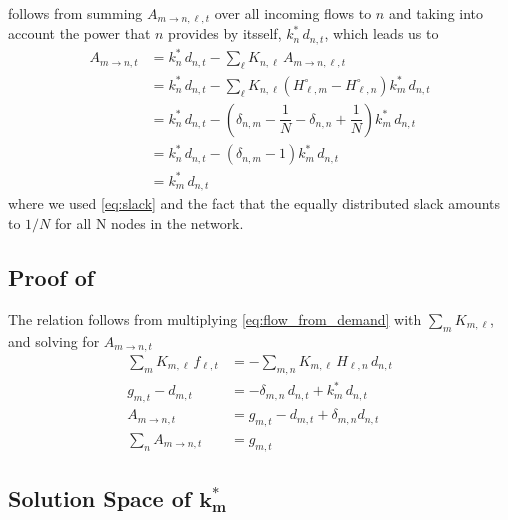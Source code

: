 \documentclass[11pt,twocolumn]{article}
\newcommand{\nodalgeneration}[1][n]{g_{#1,t}}
\newcommand{\nodaldemand}[1][n]{d_{#1,t}}
\newcommand{\incidence}[1][n]{K_{#1,\ell}}
\newcommand{\ptdf}[1][n]{H_{\ell,#1}}
\newcommand{\ptdfEqual}[1][n]{\ptdf[#1]^\circ}
\newcommand{\slackk}[1][n]{k^*_{#1}}
\newcommand{\flow}{f_{\ell,t}}
\newcommand{\allocatePeer}[1][m \rightarrow n]{A_{#1,t}}
\newcommand{\allocateTransaction}[1][m \rightarrow n]{A_{#1,\ell,t}}
\begin{document}
 follows from summing $\allocateTransaction$ over all incoming flows to $n$ and taking into account the power that $n$ provides by itsself, $\slackk \, \nodaldemand$, which leads us to
\begin{align}
 \allocatePeer &= \slackk \, \nodaldemand - \sum_{\ell} \incidence \, \allocateTransaction \\
 &= \slackk \, \nodaldemand - \sum_\ell \incidence \left(  \ptdfEqual[m] - \ptdfEqual \right) \slackk[m] \, \nodaldemand  \\
 &= \slackk \, \nodaldemand - \left(  \delta_{n,m} - \dfrac{1}{N} - \delta_{n,n} + \dfrac{1}{N} \right) \slackk[m] \, \nodaldemand  \\
 &= \slackk \, \nodaldemand - \left(  \delta_{n,m} - 1 \right) \slackk[m] \, \nodaldemand  \\
 &= \slackk[m] \, \nodaldemand 
\label{eq:proof_allocate_peer}
\end{align}
where we used \cref{eq:slack} and the fact that the equally distributed slack amounts to $1/N$ for all N nodes in the network. 



\subsection{Proof of }
\label{sec:proof_sum_n_allocate_peer}
The relation follows from multiplying \cref{eq:flow_from_demand} with $\sum_m \incidence[m]$, and solving for $\allocatePeer$
\begin{align}
\sum_m \incidence[m] \, \flow &= - \sum_{m,n} \incidence[m] \, \ptdf \, \nodaldemand \\
\nodalgeneration[m] - \nodaldemand[m] &= - \delta_{m,n} \, \nodaldemand + \slackk[m] \, \nodaldemand    \\
\allocatePeer &= \nodalgeneration[m] - \nodaldemand[m] + \delta_{m,n} \nodaldemand \\
\sum_n \allocatePeer &= \nodalgeneration[m]
\end{align}



\subsection{Solution Space of $\boldsymbol{\slackk[m]}$}
\label{sec:solution_space_of_the_slack}
\end{document}
